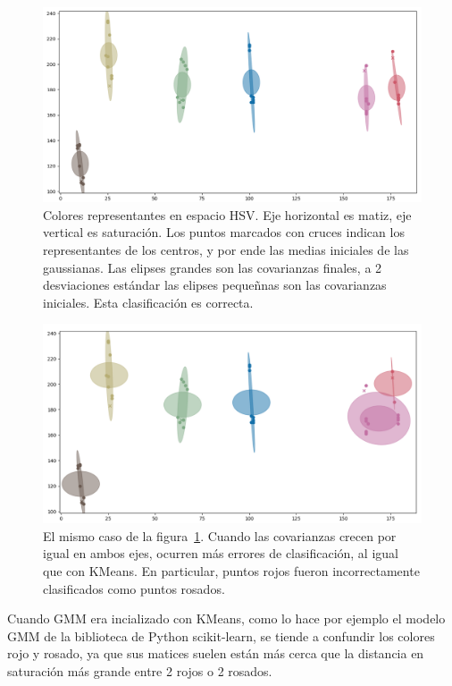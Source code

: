 \begin{figure}[h!]
	\centering
	\includegraphics[width=\textwidth]{figures/gmm}
	\caption[Colores representantes en espacio HSV.]{Colores representantes en espacio HSV. Eje horizontal es matiz, eje vertical es saturación. Los puntos marcados con cruces indican los representantes de los centros, y por ende las medias iniciales de las gaussianas. Las elipses grandes son las covarianzas finales, a 2 desviaciones estándar las elipses pequeñnas son las covarianzas iniciales. Esta clasificación es correcta.}
	\label{gmmgood}
\end{figure}

\begin{figure}[h!]
	\centering
	\includegraphics[width=\textwidth]{figures/gmm_bad}
	\caption[Gaussian Mixture Model con covarianzas circulares.]{El mismo caso de la figura~\ref{gmmgood}. Cuando las covarianzas crecen por igual en ambos ejes, ocurren más errores de clasificación, al igual que con KMeans. En particular, puntos rojos fueron incorrectamente clasificados como puntos rosados.}
	\label{gmmbad}
\end{figure}

Cuando GMM era incializado con KMeans, como lo hace por ejemplo el modelo GMM de la biblioteca de Python scikit-learn, se tiende a confundir los colores rojo y rosado, ya que sus matices suelen están más cerca que la distancia en saturación más grande entre 2 rojos o 2 rosados.

